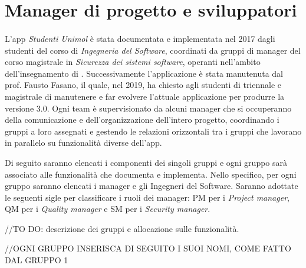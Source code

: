 \section{Manager di progetto e sviluppatori}

\paragraph{}
L'app \textit{Studenti Unimol} è stata documentata e implementata nel 2017 dagli studenti del corso di \textit{Ingegneria del Software}, coordinati da gruppi di manager del corso magistrale in \textit{Sicurezza dei sistemi software}, operanti nell'ambito dell'insegnamento di . Successivamente l'applicazione è stata manutenuta dal prof. Fausto Fasano, il quale, nel 2019, ha chiesto agli studenti di triennale e magistrale di manutenere e far evolvere l'attuale applicazione per produrre la versione 3.0. Ogni team è supervisionato da alcuni manager che si occuperanno della comunicazione e dell'organizzazione dell'intero progetto, coordinando i gruppi a loro assegnati e gestendo le relazioni orizzontali tra i gruppi che lavorano in parallelo su funzionalità diverse dell'app.

Di seguito saranno elencati i componenti dei singoli gruppi e ogni gruppo sarà associato alle funzionalità che documenta e implementa. Nello specifico, per ogni gruppo saranno elencati i manager e gli Ingegneri del Software. Saranno adottate le seguenti sigle per classificare i ruoli dei manager: PM per i \textit{Project manager}, QM per i \textit{Quality manager} e SM per i \textit{Security manager}. \newline

//TO DO: descrizione dei gruppi e allocazione sulle funzionalità.

//OGNI GRUPPO INSERISCA DI SEGUITO I SUOI NOMI, COME FATTO DAL GRUPPO 1 \\

